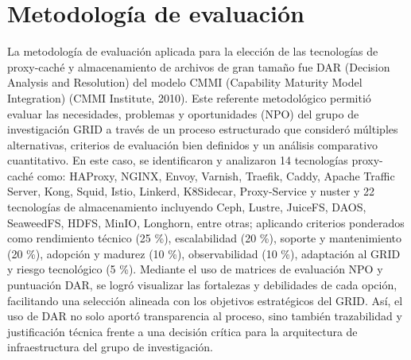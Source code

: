 \section{Metodología de evaluación}\label{sec:metodologia}

La metodología de evaluación aplicada para la elección de las
tecnologías de proxy-caché y almacenamiento de archivos de gran tamaño
fue DAR (Decision Analysis and Resolution) del modelo CMMI (Capability
Maturity Model Integration) (CMMI Institute, 2010). Este referente
metodológico permitió evaluar las necesidades, problemas y oportunidades
(NPO) del grupo de investigación GRID a través de un proceso
estructurado que consideró múltiples alternativas, criterios de
evaluación bien definidos y un análisis comparativo cuantitativo. En
este caso, se identificaron y analizaron 14 tecnologías proxy-caché
como: HAProxy, NGINX, Envoy, Varnish, Traefik, Caddy, Apache Traffic
Server, Kong, Squid, Istio, Linkerd, K8Sidecar, Proxy-Service y nuster y
22 tecnologías de almacenamiento incluyendo Ceph, Lustre, JuiceFS, DAOS,
SeaweedFS, HDFS, MinIO, Longhorn, entre otras; aplicando criterios
ponderados como rendimiento técnico (25 \%), escalabilidad (20 \%),
soporte y mantenimiento (20 \%), adopción y madurez (10 \%),
observabilidad (10 \%), adaptación al GRID y riesgo tecnológico (5 \%).
Mediante el uso de matrices de evaluación NPO y puntuación DAR, se logró
visualizar las fortalezas y debilidades de cada opción, facilitando una
selección alineada con los objetivos estratégicos del GRID. Así, el uso
de DAR no solo aportó transparencia al proceso, sino también
trazabilidad y justificación técnica frente a una decisión crítica para
la arquitectura de infraestructura del grupo de investigación.
